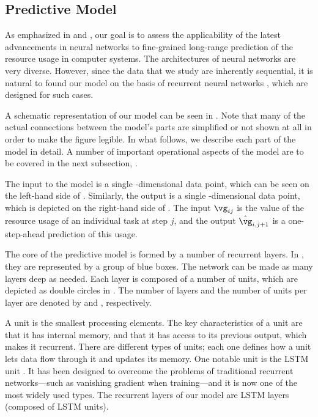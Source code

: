 \subsection{Predictive Model}

As emphasized in  and , our goal is
to assess the applicability of the latest advancements in neural networks
\cite{goodfellow2016} to fine-grained long-range prediction of the resource
usage in computer systems. The architectures of neural networks are very
diverse. However, since the data that we study are inherently sequential, it is
natural to found our model on the basis of recurrent neural networks
\cite{goodfellow2016}, which are designed for such cases.

A schematic representation of our model can be seen in
. Note that many of the actual connections between
the model's parts are simplified or not shown at all in order to make the figure
legible. In what follows, we describe each part of the model in detail. A number
of important operational aspects of the model are to be covered in the next
subsection, .

The input to the model is a single \ng-dimensional data point, which can be seen
on the left-hand side of . Similarly, the output is
a single \ng-dimensional data point, which is depicted on the right-hand side of
. The input $\vg_{ij}$ is the value of the resource
usage of an individual task at step $j$, and the output $\hat{\vg}_{i, j + 1}$
is a one-step-ahead prediction of this usage.

The core of the predictive model is formed by a number of recurrent layers. In
, they are represented by a group of blue boxes.
The network can be made as many layers deep as needed. Each layer is composed of
a number of units, which are depicted as double circles in
. The number of layers and the number of units per
layer are denoted by \nl and \nu, respectively.

A unit is the smallest processing elements. The key characteristics of a unit
are that it has internal memory, and that it has access to its previous output,
which makes it recurrent. There are different types of units; each one defines
how a unit lets data flow through it and updates its memory. One notable unit is
the \ac{LSTM} unit \cite{hochreiter1997}. It has been designed to overcome the
problems of traditional recurrent networks---such as vanishing gradient when
training---and it is now one of the most widely used types. The recurrent layers
of our model are \ac{LSTM} layers (composed of \ac{LSTM} units).

